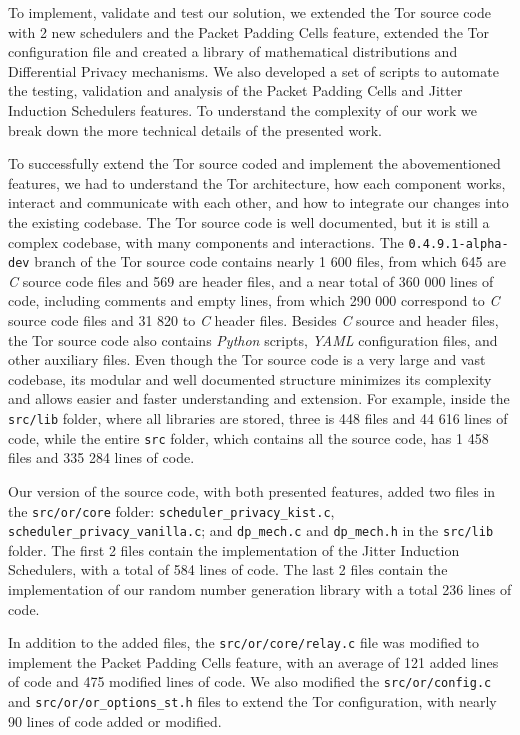 To implement, validate and test our solution, we extended the Tor source code with 2 new schedulers and the Packet Padding Cells feature, extended the Tor configuration file and created a library of mathematical distributions and Differential Privacy mechanisms. We also developed a set of scripts to automate the testing, validation and analysis of the Packet Padding Cells and Jitter Induction Schedulers features. To understand the complexity of our work we break down the more technical details of the presented work.

To successfully extend the Tor source coded and implement the abovementioned features, we had to understand the Tor architecture, how each component works, interact and communicate with each other, and how to integrate our changes into the existing codebase. The Tor source code is well documented, but it is still a complex codebase, with many components and interactions. The \texttt{0.4.9.1-alpha-dev} branch of the Tor source code contains nearly 1 600 files, from which 645 are \textit{C} source code files and 569 are header files, and a near total of 360 000 lines of code, including comments and empty lines, from which 290 000 correspond to \textit{C} source code files and 31 820 to \textit{C} header files. Besides \textit{C} source and header files, the Tor source code also contains \textit{Python} scripts, \textit{YAML} configuration files, and other auxiliary files. Even though the Tor source code is a very large and vast codebase, its modular and well documented structure minimizes its complexity and allows easier and faster understanding and extension. For example, inside the \texttt{src/lib} folder, where all libraries are stored, three is 448 files and 44 616 lines of code, while the entire \texttt{src} folder, which contains all the source code, has 1 458 files and 335 284 lines of code. 

Our version of the source code, with both presented features, added two files in the \texttt{src/or/core} folder: \texttt{scheduler\_privacy\_kist.c}, \texttt{scheduler\_privacy\_vanilla.c}; and \texttt{dp\_mech.c} and \texttt{dp\_mech.h} in the \texttt{src/lib} folder. The first 2 files contain the implementation of the Jitter Induction Schedulers, with a total of 584 lines of code. The last 2 files contain the implementation of our random number generation library with a total 236 lines of code.

In addition to the added files, the \texttt{src/or/core/relay.c} file was modified to implement the Packet Padding Cells feature, with an average of 121 added lines of code and 475 modified lines of code. We also modified the \texttt{src/or/config.c} and \texttt{src/or/or\_options\_st.h} files to extend the Tor configuration, with nearly 90 lines of code added or modified. 

